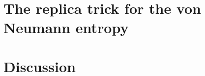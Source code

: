 \documentclass[11pt,oneside,letterpaper]{article}
\newcommand{\la}{\langle}
\let\la=\label \let\ci=\cite \let\re=\ref
\numberwithin{equation}{section}
\def \la {\label}   %
\begin{document}


 
\section{The replica trick for the von Neumann entropy}







 







\section{Discussion}
\la{sec:Conclusions} 



\appendix









\small

%
 
\end{document}
